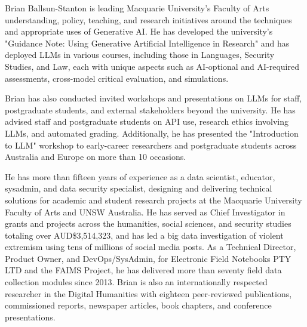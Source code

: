 
Brian Ballsun-Stanton is leading Macquarie University's Faculty of Arts understanding, policy, teaching, and research initiatives around the techniques and appropriate uses of Generative AI. He has developed the university's "Guidance Note: Using Generative Artificial Intelligence in Research" and has deployed LLMs in various courses, including those in Languages, Security Studies, and Law, each with unique aspects such as AI-optional and AI-required assessments, cross-model critical evaluation, and simulations. 

Brian has also conducted invited workshops and presentations on LLMs for staff, postgraduate students, and external stakeholders beyond the university. He has advised staff and postgraduate students on API use, research ethics involving LLMs, and automated grading. Additionally, he has presented the "Introduction to LLM" workshop to early-career researchers and postgraduate students across Australia and Europe on more than 10 occasions.

He has more than fifteen years of experience as a data scientist, educator, sysadmin, and data security specialist, designing and delivering technical solutions for academic and student research projects at the Macquarie University Faculty of Arts and UNSW Australia. He has served as Chief Investigator in grants and projects across the humanities, social sciences, and security studies totaling over AUD\$3,514,323, and has led a big data investigation of violent extremism using tens of millions of social media posts. As a Technical Director, Product Owner, and DevOps/SysAdmin, for Electronic Field Notebooks PTY LTD and the FAIMS Project, he has delivered more than seventy field data collection modules since 2013. Brian is also an internationally respected researcher in the Digital Humanities with eighteen peer-reviewed publications, commissioned reports, newspaper articles, book chapters, and conference presentations.



